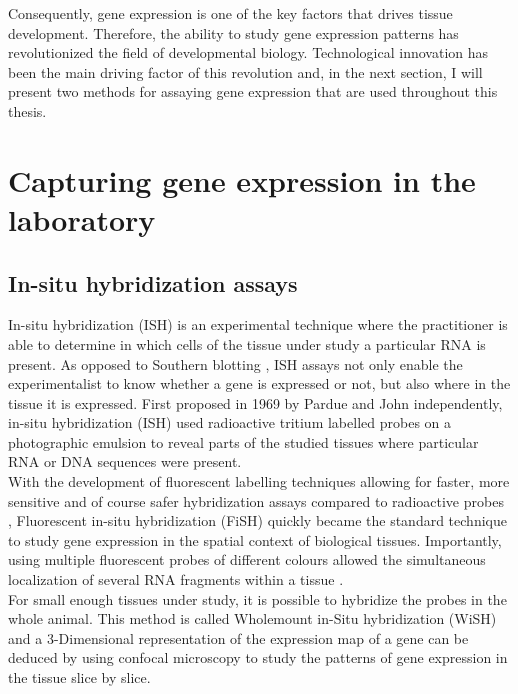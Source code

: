 	Consequently, gene expression is one of the key factors that drives tissue development. Therefore, the ability to study gene expression patterns has revolutionized the field of developmental biology. Technological innovation has been the main driving factor of this revolution and, in the next section, I will present two methods for assaying gene expression that are used throughout this thesis.


\section{Capturing gene expression in the laboratory}\label{sec:gene_expression_lab}
     \subsection{In-situ hybridization assays}
     In-situ hybridization (ISH) is an experimental technique where the practitioner is able to determine in which cells of the tissue under study a particular RNA is present. As opposed to Southern blotting \cite{southern75}, ISH assays not only enable the experimentalist to know whether a gene is expressed or not, but also where in the tissue it is expressed. First proposed in 1969 by Pardue \cite{pardue69} and John \cite{john69} independently, in-situ hybridization (ISH) used radioactive tritium labelled probes on a photographic emulsion to reveal parts of the studied tissues where particular RNA or DNA sequences were present.\\
     
      With the development of fluorescent labelling techniques \cite{landegent84,pinkel88} allowing for faster, more sensitive and of course safer hybridization assays compared to radioactive probes \cite{swiger96}, Fluorescent in-situ hybridization (FiSH) quickly became the standard technique to study gene expression in the spatial context of biological tissues. Importantly, using multiple fluorescent probes of different colours allowed the simultaneous localization of several RNA fragments within a tissue \cite{nederlof89}.\\
     
     For small enough tissues under study, it is possible to hybridize the probes in the whole animal. This method is called Wholemount in-Situ hybridization (WiSH) and a 3-Dimensional representation of the expression map of a gene can be deduced by using confocal microscopy to study the patterns of gene expression in the tissue slice by slice.
     


